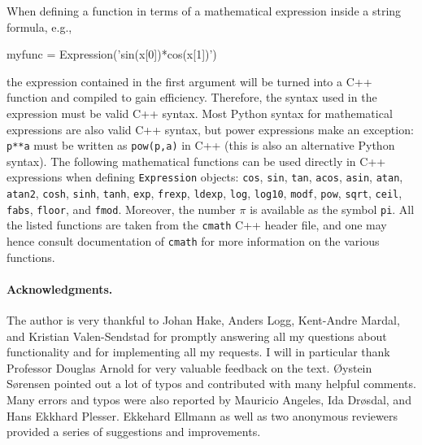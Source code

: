 When defining a function in terms of a mathematical expression inside
a string formula, e.g.,
\begin{python}
myfunc = Expression('sin(x[0])*cos(x[1])')
\end{python}
the expression contained in the first argument
will be turned into a C++ function
and compiled to gain efficiency. Therefore, 
the syntax used in the expression must be valid C++ syntax.
Most Python syntax for mathematical expressions are also valid C++ syntax,
but power expressions make an exception: {\fontsize{10pt}{10pt}\texttt{p**a}} must be written as
{\fontsize{10pt}{10pt}\texttt{pow(p,a)}} in C++ (this is also an alternative Python syntax).
The following mathematical functions can be used directly
in C++
expressions when defining {\fontsize{10pt}{10pt}\texttt{Expression}} objects: 
{\fontsize{10pt}{10pt}\texttt{cos}}, {\fontsize{10pt}{10pt}\texttt{sin}}, {\fontsize{10pt}{10pt}\texttt{tan}}, {\fontsize{10pt}{10pt}\texttt{acos}}, {\fontsize{10pt}{10pt}\texttt{asin}},
{\fontsize{10pt}{10pt}\texttt{atan}}, {\fontsize{10pt}{10pt}\texttt{atan2}}, {\fontsize{10pt}{10pt}\texttt{cosh}}, {\fontsize{10pt}{10pt}\texttt{sinh}}, {\fontsize{10pt}{10pt}\texttt{tanh}}, {\fontsize{10pt}{10pt}\texttt{exp}},
{\fontsize{10pt}{10pt}\texttt{frexp}}, {\fontsize{10pt}{10pt}\texttt{ldexp}}, {\fontsize{10pt}{10pt}\texttt{log}}, {\fontsize{10pt}{10pt}\texttt{log10}}, {\fontsize{10pt}{10pt}\texttt{modf}},
{\fontsize{10pt}{10pt}\texttt{pow}}, {\fontsize{10pt}{10pt}\texttt{sqrt}}, {\fontsize{10pt}{10pt}\texttt{ceil}}, {\fontsize{10pt}{10pt}\texttt{fabs}}, {\fontsize{10pt}{10pt}\texttt{floor}}, and {\fontsize{10pt}{10pt}\texttt{fmod}}.
Moreover, the number $\pi$ is available as the symbol {\fontsize{10pt}{10pt}\texttt{pi}}.
All the listed functions are taken from the {\fontsize{10pt}{10pt}\texttt{cmath}} C++ header file, and
one may hence
consult documentation of {\fontsize{10pt}{10pt}\texttt{cmath}} for more information on the
various functions. 



\paragraph{Acknowledgments.}
The author is very thankful to Johan Hake, Anders Logg, 
Kent-Andre Mardal, and Kristian Valen-Sendstad 
for promptly answering all my questions about
\fenics{} functionality and for implementing all my requests.
I will in particular thank
Professor Douglas Arnold for very valuable feedback on
the text. \O ystein S{\o}rensen pointed out a lot of typos
and contributed with many helpful comments.
Many errors and typos were also reported by Mauricio Angeles, Ida Dr{\o}sdal,
and Hans Ekkhard Plesser.
Ekkehard Ellmann as well as two anonymous reviewers
provided a series of suggestions and improvements.
